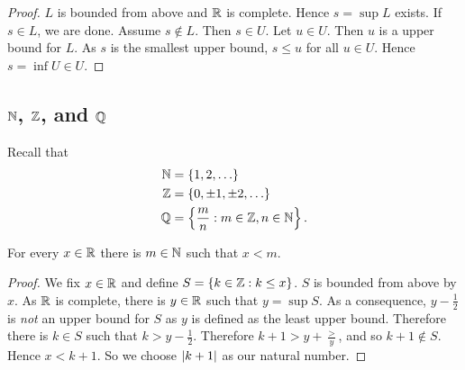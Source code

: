 \begin{proof}
	$L$ is bounded from above and $\mathbb{R}$ is complete.
	Hence $s = \sup L$ exists.
	If $s \in L$, we are done.
	Assume $s \not\in L$.
	Then $s \in U$.
	Let $u \in U$.
	Then $u$ is a upper bound for $L$.
	As $s$ is the smallest upper bound, $s \leq u$
	for all $u \in U$.
	Hence $s = \inf U \in U$.
\end{proof}

\subsection{$\mathbb{N}$, $\mathbb{Z}$, and $\mathbb{Q}$}

Recall that
\begin{align*}
	\mathbb{N} &= \left\{ 1, 2, \ldots \right\} \\
	\mathbb{Z} &= \left\{ 0, \pm 1, \pm 2, \ldots \right\} \\
	\mathbb{Q} &= \left\{ \frac mn : m \in \mathbb{Z}, n \in \mathbb{N} \right\}.
\end{align*}

\begin{proposition}
	For every $x \in \mathbb{R}$ there is $m \in \mathbb{N}$ such that $x < m$.
\end{proposition}

\begin{proof}
	We fix $x \in \mathbb{R}$ and define $S = \left\{ k \in \mathbb{Z}: k \leq x \right\}$.
	$S$ is bounded from above by $x$.
	As $\mathbb{R}$ is complete, there is $y \in \mathbb{R}$ such that $y = \sup S$.
	As a consequence, $y - \frac12$ is \emph{not} an upper bound for $S$
	as $y$ is defined as the least upper bound.
	Therefore there is $k \in S$ such that $k > y - \frac12$.
	Therefore $k + 1 > y + \frac > y$, and so $k + 1 \not\in S$.
	Hence $x < k + 1$. So we choose $\left\lvert k + 1 \right\rvert$ as our natural number.
\end{proof}


